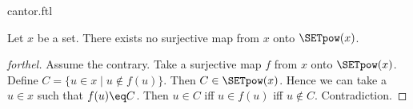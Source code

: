\documentclass{naproche-library}
\begin{document}
\begin{smodule}[title=Cantor's Theorem]{cantor.ftl}

\begin{theorem}[forthel,title=Cantor's Theorem,id=cantor_017529138285230]
  Let $x$ be a set.
  There exists no surjective map from $x$ onto $\SETpow(x)$.
\end{theorem}
\begin{proof}[forthel]
  Assume the contrary.
  Take a surjective map $f$ from $x$ onto $\SETpow(x)$.
  Define $C = \{ u \in x \mid u \notin f(u) \}$.
  Then $C \in \SETpow(x)$.
  Hence we can take a $u \in x$ such that $f(u) \eq C$.
  Then $u \in C$ iff $u \in f(u)$ iff $u \notin C$.
  Contradiction.
\end{proof}
\end{smodule}
\end{document}
